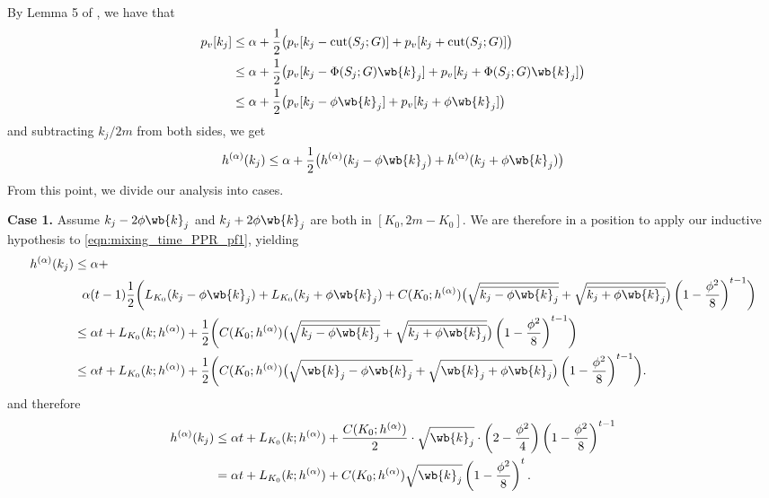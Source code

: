 	By Lemma 5 of \citet{andersen2006}, we have that
	\begin{align}
	p_v[k_j] & \leq \alpha + \frac{1}{2} \bigl(p_v[k_j - \mathrm{cut}(S_j;G)] + p_v[k_j + \mathrm{cut}(S_j;G)] \bigr) \nonumber\\
	& \leq \alpha + \frac{1}{2} \bigl(p_v[k_j - \Phi(S_j;G) \wb{k}_j] + p_v[k_j + \Phi(S_j;G) \wb{k}_j]  \bigr) \nonumber \\
	& \leq \alpha + \frac{1}{2} \bigl(p_v[k_j - \phi \wb{k}_j] + p_v[k_j + \phi \wb{k}_j]\bigr) \nonumber
	\end{align}
	and subtracting $k_j/2m$ from both sides, we get
	\begin{equation}
	\label{eqn:mixing_time_PPR_pf1}
	h^{(\alpha)}(k_j) \leq \alpha + \frac{1}{2} \bigl(h^{(\alpha)}(k_j - \phi \wb{k}_j) + h^{(\alpha)}(k_j +  \phi \wb{k}_j) \bigr)
	\end{equation}
	From this point, we divide our analysis into cases. 
	
	\textbf{Case 1.}
	Assume $k_j - 2 \phi \wb{k}_j$ and $k_j + 2 \phi \wb{k}_j$ are both in $[K_0,2m  - K_0]$. We are therefore in a position to apply our inductive hypothesis to \eqref{eqn:mixing_time_PPR_pf1}, yielding
	\begin{align*}
	h^{(\alpha)}(k_j) & \leq \alpha +~~ \\
	& ~~ \alpha(t-1) \frac{1}{2}\biggl(L_{K_0}(k_j - \phi \wb{k}_j) + L_{K_0}(k_j + \phi \wb{k}_j) + C(K_0;h^{(\alpha)})\bigl(\sqrt{\overline{k_j - \phi \wb{k}_j}} + \sqrt{\overline{k_j + \phi \wb{k}_j}}\bigr)\left(1 - \frac{\phi^2}{8}\right)^{t-1} \biggr) \\
	& \leq \alpha t + L_{K_0}(k;h^{(\alpha)}) + \frac{1}{2}\biggl(C(K_0;h^{(\alpha)})\bigl(\sqrt{\overline{k_j - \phi \wb{k}_j}} + \sqrt{\overline{k_j + \phi \wb{k}_j}}\bigr)\left(1 - \frac{\phi^2}{8}\right)^{t-1} \biggr) \\
	& \leq \alpha t + L_{K_0}(k;h^{(\alpha)}) + \frac{1}{2}\biggl(C(K_0;h^{(\alpha)})\bigl(\sqrt{\wb{k}_j - \phi \wb{k}_j} + \sqrt{\wb{k}_j + \phi \wb{k}_j}\bigr)\left(1 - \frac{\phi^2}{8}\right)^{t-1} \biggr).
	\end{align*}
	and therefore
	\begin{align*}
	h^{(\alpha)}(k_j) & \leq  \alpha t + L_{K_0}(k;h^{(\alpha)}) + \frac{C(K_0;h^{(\alpha)})}{2}\cdot \sqrt{\wb{k}_j}\cdot\left(2 - \frac{\phi^2}{4}\right)\left(1 - \frac{\phi^2}{8}\right)^{t-1} \\
	& = \alpha t + L_{K_0}(k;h^{(\alpha)}) + C(K_0;h^{(\alpha)})\sqrt{\wb{k}_j}\left(1 - \frac{\phi^2}{8}\right)^{t}.
	\end{align*}
	
